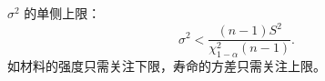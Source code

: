 \begin{example}[正态总体方差的单侧置信区间]
$\sigma^2$ 的单侧上限：
\begin{equation}
    \sigma^2 < \frac{(n-1)S^2}{\chi^2_{1-\alpha}(n-1)}.
\end{equation}
如材料的强度只需关注下限，寿命的方差只需关注上限。
\end{example}

